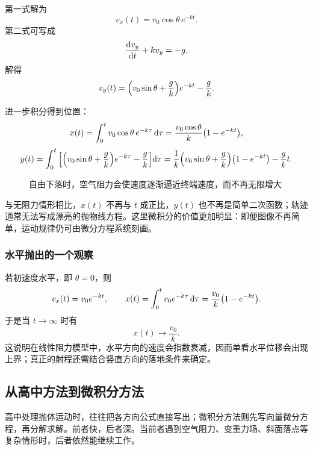 第一式解为
\[
 v_x(t)=v_0\cos\theta\, e^{-kt}.
\]
第二式可写成
\[
\dv{v_y}{t}+kv_y=-g,
\]
解得
\[
 v_y(t)=\qty(v_0\sin\theta+\frac{g}{k})e^{-kt}-\frac{g}{k}.
\]

进一步积分得到位置：
\[
 x(t)=\int_0^t v_0\cos\theta\, e^{-k\tau}\,\dd \tau
=\frac{v_0\cos\theta}{k}\qty(1-e^{-kt}),
\]
\[
 y(t)=\int_0^t \qty[\qty(v_0\sin\theta+\frac{g}{k})e^{-k\tau}-\frac{g}{k}]\dd \tau
=\frac{1}{k}\qty(v_0\sin\theta+\frac{g}{k})\qty(1-e^{-kt})-\frac{g}{k}t.
\]

\begin{figure}[htbp]
\centering
{}
\caption{自由下落时，空气阻力会使速度逐渐逼近终端速度，而不再无限增大}
\end{figure}

\begin{remark}
与无阻力情形相比，$x(t)$ 不再与 $t$ 成正比，$y(t)$ 也不再是简单二次函数；轨迹通常无法写成漂亮的抛物线方程。这里微积分的价值更加明显：即便图像不再简单，运动规律仍可由微分方程系统刻画。
\end{remark}

\subsubsection*{水平抛出的一个观察}
若初速度水平，即 $\theta=0$，则
\[
 v_x(t)=v_0 e^{-kt},
\qquad
 x(t)=\int_0^t v_0 e^{-k\tau}\,\dd \tau=\frac{v_0}{k}\qty(1-e^{-kt}).
\]
于是当 $t\to\infty$ 时有
\[
 x(t)\to\frac{v_0}{k}.
\]
这说明在线性阻力模型中，水平方向的速度会指数衰减，因而单看水平位移会出现上界；真正的射程还需结合竖直方向的落地条件来确定。

\subsection{从高中方法到微积分方法}

高中处理抛体运动时，往往把各方向公式直接写出；微积分方法则先写向量微分方程，再分解求解。前者快，后者深。当前者遇到空气阻力、变重力场、斜面落点等复杂情形时，后者依然能继续工作。


